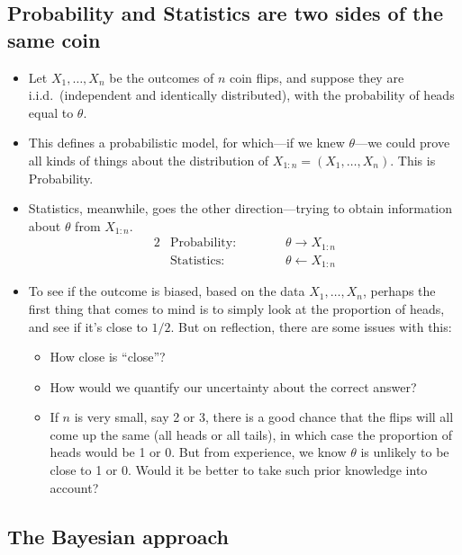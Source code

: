 \documentclass[12pt]{article}
\begin{document}
\subsection{Probability and Statistics are two sides of the same coin}
\begin{itemize}
\item Let $X_1,\dotsc,X_n$ be the outcomes of $n$ coin flips, and suppose they are i.i.d.\ (independent and identically distributed), with the probability of heads equal to $\theta$.
\item This defines a probabilistic model, for which---if we knew $\theta$---we could prove all kinds of things about the distribution of $X_{1:n} = (X_1,\dotsc,X_n)$. This is Probability.
\item Statistics, meanwhile, goes the other direction---trying to obtain information about $\theta$ from $X_{1:n}$.
\begin{alignat*}{2}
&\text{Probability: } \qquad && \theta\longrightarrow X_{1:n} \\
&\text{Statistics: } \qquad && \theta\longleftarrow X_{1:n}
\end{alignat*}
\item To see if the outcome is biased, based on the data $X_1,\dotsc,X_n$, perhaps the first thing that comes to mind is to simply look at the proportion of heads, and see if it's close to $1/2$. But on reflection, there are some issues with this:
\begin{itemize}
\item How close is ``close''?
\item How would we quantify our uncertainty about the correct answer?
\item If $n$ is very small, say 2 or 3, there is a good chance that the flips will all come up the same (all heads or all tails), in which case the proportion of heads would be 1 or 0. But from experience, we know $\theta$ is unlikely to be close to 1 or 0. Would it be better to take such prior knowledge into account?
\end{itemize}
\end{itemize}

\subsection{The Bayesian approach}
\end{document}
